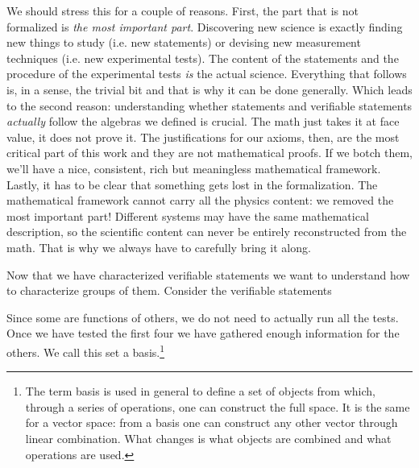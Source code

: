 \documentclass[11pt,letterpaper,fleqn]{memoir} %
\begin{document}
We should stress this for a couple of reasons. First, the part that is not formalized is \emph{the most important part}. Discovering new science is exactly finding new things to study (i.e. new statements) or devising new measurement techniques (i.e. new experimental tests). The content of the statements and the procedure of the experimental tests \emph{is} the actual science. Everything that follows is, in a sense, the trivial bit and that is why it can be done generally. Which leads to the second reason: understanding whether statements and verifiable statements \emph{actually} follow the algebras we defined is crucial. The math just takes it at face value, it does not prove it. The justifications for our axioms, then, are the most critical part of this work and they are not mathematical proofs. If we botch them, we'll have a nice, consistent, rich but meaningless mathematical framework. Lastly, it has to be clear that something gets lost in the formalization. The mathematical framework cannot carry all the physics content: we removed the most important part! Different systems may have the same mathematical description, so the scientific content can never be entirely reconstructed from the math. That is why we always have to carefully bring it along.

Now that we have characterized verifiable statements we want to understand how to characterize groups of them. Consider the verifiable statements
\begin{description}
	\item {}
	\item {}
	\item {}
	\item {}
	\item {}
	\item {}
	\item {}
\end{description}
Since some are functions of others, we do not need to actually run all the tests. Once we have tested the first four we have gathered enough information for the others. We call this set a basis.\footnote{The term basis is used in general to define a set of objects from which, through a series of operations, one can construct the full space. It is the same for a vector space: from a basis one can construct any other vector through linear combination. What changes is what objects are combined and what operations are used.}
\end{document}
